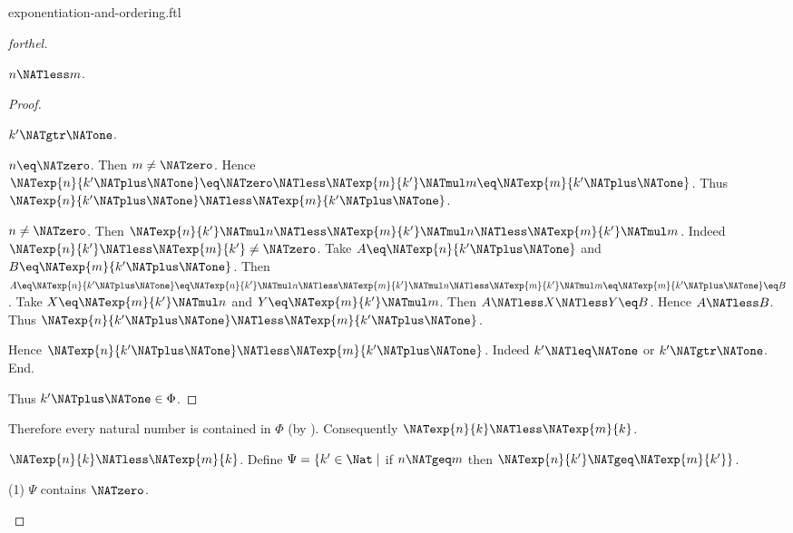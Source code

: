\documentclass{naproche-library}
\begin{document}
\begin{smodule}[title=Exponentiation and Ordering]{exponentiation-and-ordering.ftl}
\begin{proof}[forthel]
\begin{case}{$n \NATless m$.}
\begin{proof}
        \begin{case}{$k' \NATgtr \NATone$.}
          \begin{case}{$n \eq \NATzero$.}
            Then $m \neq \NATzero$.
            Hence $\NATexp{n}{k' \NATplus \NATone}
              \eq \NATzero
              \NATless \NATexp{m}{k'} \NATmul m
              \eq \NATexp{m}{k' \NATplus \NATone}$.
            Thus $\NATexp{n}{k' \NATplus \NATone} \NATless \NATexp{m}{k' \NATplus \NATone}$.
          \end{case}

          \begin{case}{$n \neq \NATzero$.}
            Then $\NATexp{n}{k'} \NATmul n
              \NATless \NATexp{m}{k'} \NATmul n
              \NATless \NATexp{m}{k'} \NATmul m$.
            Indeed $\NATexp{n}{k'} \NATless \NATexp{m}{k'} \neq \NATzero$.
            Take $A \eq \NATexp{n}{k' \NATplus \NATone}$ and $B \eq \NATexp{m}{k' \NATplus \NATone}$. %
            Then $A
              \eq \NATexp{n}{k' \NATplus \NATone}
              \eq \NATexp{n}{k'} \NATmul n
              \NATless \NATexp{m}{k'} \NATmul n
              \NATless \NATexp{m}{k'} \NATmul m
              \eq \NATexp{m}{k' \NATplus \NATone}
              \eq B$.
            Take $X \eq \NATexp{m}{k'} \NATmul n$ and $Y \eq \NATexp{m}{k'} \NATmul m$.
            Then $A \NATless X \NATless Y \eq B$.
            Hence $A \NATless B$.
            Thus $\NATexp{n}{k' \NATplus \NATone} \NATless \NATexp{m}{k' \NATplus \NATone}$.
          \end{case}
        \end{case}

        Hence $\NATexp{n}{k' \NATplus \NATone} \NATless \NATexp{m}{k' \NATplus \NATone}$.
        Indeed $k' \NATleq \NATone$ or $k' \NATgtr \NATone$.
      End.

      Thus $k' \NATplus \NATone \in \Phi$.
    \end{proof}

    Therefore every natural number is contained in $\Phi$ (by ).
    Consequently $\NATexp{n}{k} \NATless \NATexp{m}{k}$.
  \end{case}

  \begin{case}{$\NATexp{n}{k} \NATless \NATexp{m}{k}$.}
    Define $\Psi = \{ k' \in \Nat \mid$ if $n \NATgeq m$ then $\NATexp{n}{k'} \NATgeq \NATexp{m}{k'} \}$.

    (1) $\Psi$ contains $\NATzero$.


\end{case}
\end{proof}
\end{smodule}
\end{document}
